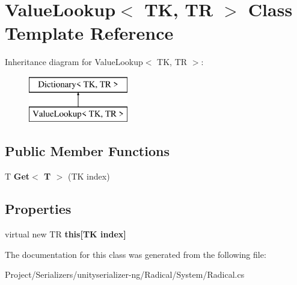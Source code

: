 \hypertarget{class_value_lookup}{}\section{Value\+Lookup$<$ TK, TR $>$ Class Template Reference}
\label{class_value_lookup}
Inheritance diagram for Value\+Lookup$<$ TK, TR $>$\+:\begin{figure}[H]
\begin{center}
\leavevmode
\includegraphics[height=2.000000cm]{class_value_lookup}
\end{center}
\end{figure}
\subsection*{Public Member Functions}
\begin{DoxyCompactItemize}
\item 
\mbox{\label{class_value_lookup_a14914a625a7b67b09a3a1fc19d81e95c}} 
T {\bfseries Get$<$ T $>$} (TK index)
\end{DoxyCompactItemize}
\subsection*{Properties}
\begin{DoxyCompactItemize}
\item 
\mbox{\label{class_value_lookup_ab97673769de1de0b42b7f7afa235981f}} 
virtual new TR {\bfseries this\mbox{[}\+T\+K index\mbox{]}}
\end{DoxyCompactItemize}


The documentation for this class was generated from the following file\+:\begin{DoxyCompactItemize}
\item 
Project/\+Serializers/unityserializer-\/ng/\+Radical/\+System/Radical.\+cs\end{DoxyCompactItemize}
